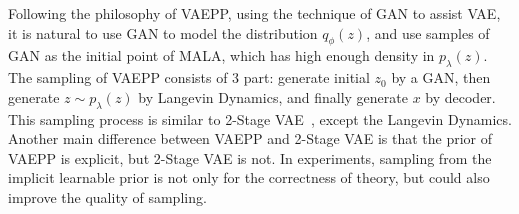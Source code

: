 Following the philosophy of VAEPP, \IE using the technique of GAN to assist VAE, it is natural to use GAN to model the distribution $q_\phi(z)$, and use samples of GAN as the initial point of MALA, which has high enough density in $p_\lambda(z)$. The sampling of VAEPP consists of 3 part: generate initial $z_0$ by a GAN, then generate $z \sim p_\lambda(z)$ by Langevin Dynamics, and finally generate $x$ by decoder. This sampling process is similar to 2-Stage VAE~\cite{dai2019diagnosing}, except the Langevin Dynamics. Another main difference between VAEPP and 2-Stage VAE is that the prior of VAEPP is explicit, but 2-Stage VAE is not. In experiments, sampling from the implicit learnable prior is not only for the correctness of theory, but could also improve the quality of sampling. 


 
 